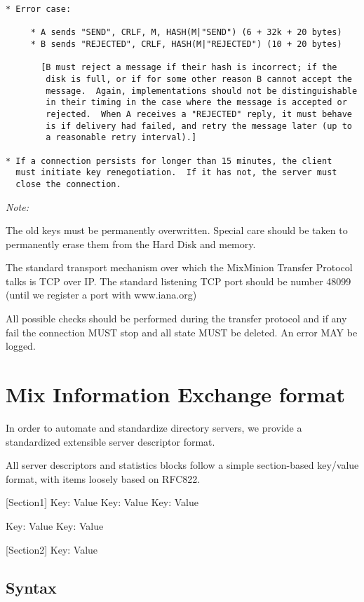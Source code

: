 \begin{verbatim}
* Error case:

     * A sends "SEND", CRLF, M, HASH(M|"SEND") (6 + 32k + 20 bytes)
     * B sends "REJECTED", CRLF, HASH(M|"REJECTED") (10 + 20 bytes)
    
       [B must reject a message if their hash is incorrect; if the
        disk is full, or if for some other reason B cannot accept the
        message.  Again, implementations should not be distinguishable
        in their timing in the case where the message is accepted or
        rejected.  When A receives a "REJECTED" reply, it must behave
        is if delivery had failed, and retry the message later (up to
        a reasonable retry interval).]

* If a connection persists for longer than 15 minutes, the client
  must initiate key renegotiation.  If it has not, the server must
  close the connection.

\end{verbatim}

\emph{Note:}

The old keys must be permanently overwritten. Special care should be
taken to permanently erase them from the Hard Disk and memory. 

The standard transport mechanism over which the MixMinion Transfer
Protocol talks is TCP over IP. The standard listening TCP port should be 
number 48099 (until we register a port with www.iana.org)

All possible checks should be performed during the transfer protocol
and if any fail the connection MUST stop and all state MUST
be deleted. An error MAY be logged. 

\section{Mix Information Exchange format}

In order to automate and standardize directory servers, we provide 
a standardized extensible server descriptor format.

All server descriptors and statistics blocks follow a simple
section-based key/value format, with items loosely based on RFC822.

[Section1]
Key: Value
Key: Value
Key: Value

Key: Value
Key: Value

[Section2]
Key: Value

\subsection{Syntax}

